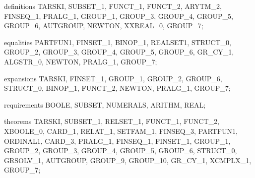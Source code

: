 \nwenddocs{}\endmoddef\nwstartdeflinemarkup{}\nwenddeflinemarkup
 definitions TARSKI, SUBSET_1, FUNCT_1, FUNCT_2, ARYTM_2, FINSEQ_1, PRALG_1,
   GROUP_1, GROUP_3, GROUP_4, GROUP_5, GROUP_6, AUTGROUP, NEWTON, XXREAL_0, GROUP_7;
\nwendcode{}\nwdocspar

\nwenddocs{}\endmoddef\nwstartdeflinemarkup{}\nwenddeflinemarkup
 equalities PARTFUN1, FINSET_1, BINOP_1, REALSET1, STRUCT_0, GROUP_2,
   GROUP_3, GROUP_4, GROUP_5, GROUP_6, GR_CY_1, ALGSTR_0, NEWTON,
   PRALG_1, GROUP_7;
\nwendcode{}\nwdocspar

\nwenddocs{}\endmoddef\nwstartdeflinemarkup{}\nwenddeflinemarkup
 expansions TARSKI, FINSET_1, GROUP_1, GROUP_2, GROUP_6, STRUCT_0, BINOP_1,
   FUNCT_2, NEWTON, PRALG_1, GROUP_7;
\nwendcode{}\nwdocspar

\nwenddocs{}\endmoddef\nwstartdeflinemarkup\nwenddeflinemarkup
 requirements BOOLE, SUBSET, NUMERALS, ARITHM, REAL;
\nwendcode{}\nwdocspar

\nwenddocs{}\endmoddef\nwstartdeflinemarkup{}\nwenddeflinemarkup
 theorems
   TARSKI, SUBSET_1, RELSET_1, FUNCT_1, FUNCT_2, XBOOLE_0, CARD_1, RELAT_1,
   SETFAM_1, FINSEQ_3, PARTFUN1, ORDINAL1, CARD_3, PRALG_1, FINSEQ_1, FINSET_1,
   GROUP_1, GROUP_2, GROUP_3, GROUP_4, GROUP_5, GROUP_6, STRUCT_0, GRSOLV_1,
   AUTGROUP, GROUP_9, GROUP_10, GR_CY_1, XCMPLX_1, GROUP_7;
\nwendcode{}\nwdocspar

